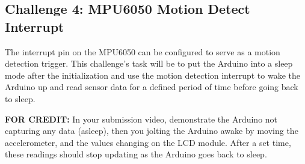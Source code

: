     \subsection*{Challenge 4: MPU6050 Motion Detect Interrupt}
    The interrupt pin on the MPU6050 can be configured to serve as a motion detection trigger.
    This challenge's task will be to put the Arduino into a sleep mode after the initialization and use the motion detection interrupt to wake the Arduino up and read sensor data for a defined period of time before going back to sleep.

    \textbf{FOR CREDIT:} In your submission video, demonstrate the Arduino not capturing any data (asleep), then you jolting the Arduino awake by moving the accelerometer, and the values changing on the LCD module.
    After a set time, these readings should stop updating as the Arduino goes back to sleep.
